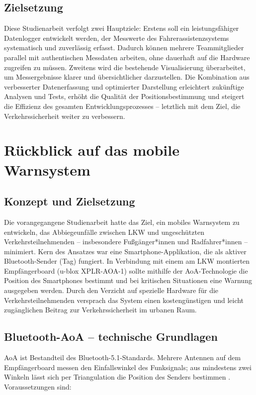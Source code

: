 \documentclass[a4paper, 12pt]{article} %
\begin{document}
\clearpage

\subsection{Zielsetzung}
Diese Studienarbeit verfolgt zwei Hauptziele: Erstens soll ein leistungsfähiger Datenlogger entwickelt werden, der Messwerte des 
Fahrerassistenzsystems systematisch und zuverlässig erfasst. Dadurch können mehrere Teammitglieder parallel mit authentischen Messdaten arbeiten,
 ohne dauerhaft auf die Hardware zugreifen zu müssen. Zweitens wird die bestehende Visualisierung überarbeitet, um Messergebnisse klarer und 
 übersichtlicher darzustellen. Die Kombination aus verbesserter Datenerfassung und optimierter Darstellung erleichtert zukünftige Analysen und Tests, 
 erhöht die Qualität der Positionsbestimmung und steigert die Effizienz des gesamten Entwicklungsprozesses – letztlich mit dem Ziel, 
 die Verkehrssicherheit weiter zu verbessern.

 \clearpage


\section{Rückblick auf das mobile Warnsystem}

\subsection{Konzept und Zielsetzung}
Die vorangegangene Studienarbeit hatte das Ziel, ein mobiles Warnsystem zu entwickeln, das Abbiegeunfälle zwischen \ac{LKW} und ungeschützten 
Verkehrsteilnehmenden – insbesondere Fußgänger*innen und Radfahrer*innen – minimiert.  
Kern des Ansatzes war eine Smartphone-Applikation, die als aktiver Bluetooth-Sender (Tag) fungiert. In Verbindung mit einem am \ac{LKW} montierten 
Empfängerboard (u-blox XPLR-AOA-1) sollte mithilfe der \acf{AoA}-Technologie die Position des Smartphones bestimmt und bei kritischen Situationen eine 
Warnung ausgegeben werden.  
Durch den Verzicht auf spezielle Hardware für die Verkehrsteilnehmenden versprach das System einen kostengünstigen und leicht zugänglichen Beitrag zur 
Verkehrssicherheit im urbanen Raum.

\subsection{Bluetooth-AoA – technische Grundlagen}
\ac{AoA} ist Bestandteil des Bluetooth-5.1-Standards. Mehrere Antennen auf dem Empfängerboard messen den Einfallswinkel des Funksignals; aus 
mindestens zwei Winkeln lässt sich per Triangulation die Position des Senders bestimmen \cite{miller2021bluetooth,uBloxAoAWhitepaper}.  
Voraussetzungen sind:
\end{document}
